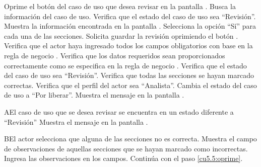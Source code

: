  \begin{UCtrayectoria}
	\UCpaso[\UCactor] Oprime el botón \btnRevisar del caso de uso que desea revisar en la pantalla .
    \UCpaso[\UCsist] Busca la información del caso de uso. 
    \UCpaso[\UCsist] Verifica que el estado del caso de uso sea ``Revisión''. 
    \UCpaso[\UCsist] Muestra la información encontrada en la pantalla .
    \UCpaso[\UCactor] Selecciona la opción ``Sí'' para cada una de las secciones.  \label{cu5.5:selecciona}
	\UCpaso[\UCactor] Solicita guardar la revisión oprimiendo el botón .  \label{cu5.5:oprime}
	\UCpaso[\UCsist] Verifica que el actor haya ingresado todos los campos obligatorios con base en la regla de negocio . 
	\UCpaso[\UCsist] Verifica que los datos requeridos sean proporcionados correctamente como se especifica en la regla de negocio . 
    \UCpaso[\UCsist] Verifica que el estado del caso de uso sea ``Revisión''. 
    \UCpaso[\UCsist] Verifica que todas las secciones se hayan marcado correctas. 
    \UCpaso[\UCsist] Verifica que el perfil del actor sea ``Analista''. 
    \UCpaso[\UCsist] Cambia el estado del caso de uso a ``Por liberar''.
    \UCpaso[\UCsist] Muestra el mensaje  en la pantalla .
 \end{UCtrayectoria}
 
 \begin{UCtrayectoriaA}{A}{El caso de uso que se desea revisar se encuentra en un estado diferente a ``Revisión''}
    \UCpaso[\UCsist] Muestra el mensaje  en la pantalla .
 \end{UCtrayectoriaA} 
 
 \begin{UCtrayectoriaA}{B}{El actor selecciona que alguna de las secciones no es correcta.}
    \UCpaso[\UCsist] Muestra el campo de observaciones de aquellas secciones que se hayan marcado como incorrectas.
    \UCpaso[\UCactor] Ingresa las observaciones en los campos.
	\UCpaso[] Continúa con el paso \ref{cu5.5:oprime}.
 \end{UCtrayectoriaA}
 
